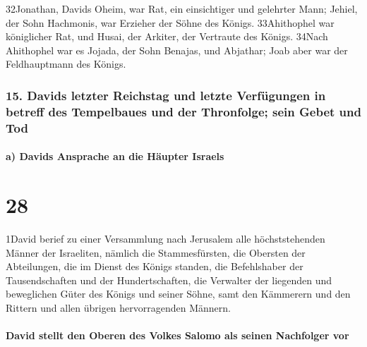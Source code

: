32Jonathan, Davids Oheim, war Rat, ein einsichtiger und gelehrter Mann;
Jehiel, der Sohn Hachmonis, war Erzieher der Söhne des Königs.
33Ahithophel war königlicher Rat, und Husai, der Arkiter, der Vertraute
des Königs. 34Nach Ahithophel war es Jojada, der Sohn Benajas, und
Abjathar; Joab aber war der Feldhauptmann des Königs.

\hypertarget{davids-letzter-reichstag-und-letzte-verfuxfcgungen-in-betreff-des-tempelbaues-und-der-thronfolge-sein-gebet-und-tod}{%
\subsubsection{15. Davids letzter Reichstag und letzte Verfügungen in
betreff des Tempelbaues und der Thronfolge; sein Gebet und
Tod}\label{davids-letzter-reichstag-und-letzte-verfuxfcgungen-in-betreff-des-tempelbaues-und-der-thronfolge-sein-gebet-und-tod}}

\hypertarget{a-davids-ansprache-an-die-huxe4upter-israels}{%
\paragraph{a) Davids Ansprache an die Häupter
Israels}\label{a-davids-ansprache-an-die-huxe4upter-israels}}

\hypertarget{section-27}{%
\section{28}\label{section-27}}

1David berief zu einer Versammlung nach Jerusalem alle höchststehenden
Männer der Israeliten, nämlich die Stammesfürsten, die Obersten der
Abteilungen, die im Dienst des Königs standen, die Befehlshaber der
Tausendschaften und der Hundertschaften, die Verwalter der liegenden und
beweglichen Güter des Königs und seiner Söhne, samt den Kämmerern und
den Rittern und allen übrigen hervorragenden Männern.

\hypertarget{david-stellt-den-oberen-des-volkes-salomo-als-seinen-nachfolger-vor}{%
\paragraph{David stellt den Oberen des Volkes Salomo als seinen
Nachfolger
vor}\label{david-stellt-den-oberen-des-volkes-salomo-als-seinen-nachfolger-vor}}

